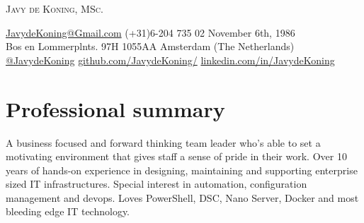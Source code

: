 \begin{center}

\fontsize{28}{28}\selectfont\scshape
Javy de Koning, MSc.\\

\fontsize{10}{10}\selectfont\scshape

{\faEnvelope } \url{JavydeKoning@Gmail.com} {\faPhoneSquare} (+31)6-204 735 02 {\faCalendar} November 6th, 1986\\

{\faMapMarker} Bos en Lommerplnts. 97H {\large\textperiodcentered} 1055AA {\large\textperiodcentered} Amsterdam (The Netherlands) \\

{\faTwitterSquare} \href{https://twitter.com/javydekoning}{@JavydeKoning} {\faGithubSquare} \url{github.com/JavydeKoning/} {\faLinkedinSquare} \url{linkedin.com/in/JavydeKoning}

\end{center}

\section{Professional summary}
A business focused and forward thinking team leader who's able to set a motivating environment that gives staff a sense of pride in their work.
Over 10 years of hands-on experience in designing, maintaining and supporting enterprise sized IT infrastructures.
Special interest in automation, configuration management and devops.
Loves PowerShell, DSC, Nano Server, Docker and most bleeding edge IT technology.